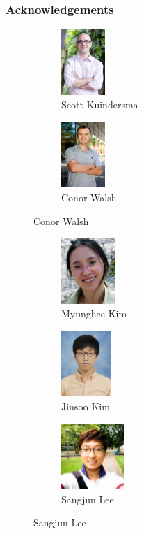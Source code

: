 \documentclass[compress, xcolor=pst]{beamer}
\begin{document}
\begin{frame}
	\frametitle{\textbf{Acknowledgements}}
	\begin{figure}
	\captionsetup[subfigure]{labelformat=empty}
	\begin{subfigure}{.5\textwidth}
	\centering
	\includegraphics[height=2.5cm]{scott-seas_0}
	\caption{Scott Kuindersma}
	\end{subfigure}%
	\begin{subfigure}{.5\textwidth}
	\centering
	\includegraphics[height=2.5cm]{walsh_200x300}
	\caption{Conor Walsh}
	\end{subfigure}%
	\end{figure}

	\begin{figure}
	\captionsetup[subfigure]{labelformat=empty}
	\begin{subfigure}{.3\textwidth}
	\centering
	\includegraphics[height=2.5cm]{kim_myunghee}
	\caption{Myunghee Kim}
	\end{subfigure}%
	\begin{subfigure}{.3\textwidth}
	\centering
	\includegraphics[height=2.5cm]{kim_jinsoo}
	\caption{Jinsoo Kim}
	\end{subfigure}%
	\begin{subfigure}{.3\textwidth}
	\centering
	\includegraphics[height=2.5cm]{sangjun}
	\caption{Sangjun Lee}
	\end{subfigure}%
	\end{figure}
\end{frame}
\end{document}
